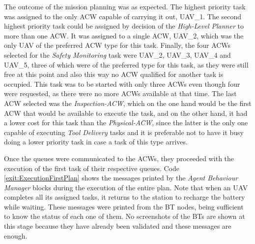 The outcome of the mission planning was as expected. The highest priority task was assigned to the only \gls{ACW} capable of carrying it out, UAV\_1. The second highest priority task could be assigned by decision of the \emph{High-Level Planner} to more than one \gls{ACW}. It was assigned to a single \gls{ACW}, UAV\_2, which was the only \gls{UAV} of the preferred \gls{ACW} type for this task. Finally, the four \glspl{ACW} selected for the \emph{Safety Monitoring} task were UAV\_2, UAV\_3, UAV\_4 and UAV\_5, three of which were of the preferred type for this task, as they were still free at this point and also this way no \gls{ACW} qualified for another task is occupied. This task was to be started with only three \glspl{ACW} even though four were requested, as there were no more \glspl{ACW} available at that time. The last \gls{ACW} selected was the \emph{Inspection-ACW}, which on the one hand would be the first \gls{ACW} that would be available to execute the task, and on the other hand, it had a lower cost for this task than the \emph{Physical-ACW}, since the latter is the only one capable of executing \emph{Tool Delivery} tasks and it is preferable not to have it busy doing a lower priority task in case a task of this type arrives.

Once the queues were communicated to the \glspl{ACW}, they proceeded with the execution of the first task of their respective queues. Code \ref{exit:ExecutionFirstPlan} shows the messages printed by the \emph{Agent Behaviour Manager} blocks during the execution of the entire plan. Note that when an \gls{UAV} completes all its assigned tasks, it returns to the station to recharge the battery while waiting. These messages were printed from the \gls{BT} nodes, being sufficient to know the status of each one of them.  No screenshots of the \glspl{BT} are shown at this stage because they have already been validated and these messages are enough.

